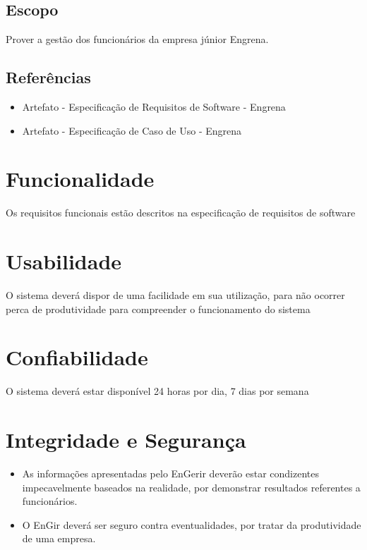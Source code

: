 \begin{apendicesenv}
\subsection{Escopo}

Prover a gestão dos funcionários da empresa júnior Engrena.

\subsection{Referências}

\begin{itemize}
\item{Artefato - Especificação de Requisitos de Software - Engrena}
\item{Artefato - Especificação de Caso de Uso - Engrena}
\end{itemize}

\section{Funcionalidade}

Os requisitos funcionais estão descritos na especificação de requisitos de software

\section{Usabilidade}

O sistema deverá dispor de uma facilidade em sua utilização, para não ocorrer perca de produtividade para compreender o funcionamento do sistema

\section{Confiabilidade}

O sistema deverá estar disponível 24 horas por dia, 7 dias por semana

\section{Integridade e Segurança}

\begin{itemize}
\item{As informações apresentadas pelo EnGerir deverão estar condizentes impecavelmente baseados na realidade, por demonstrar resultados referentes a funcionários.}
\item{O EnGir deverá ser seguro contra eventualidades, por tratar da produtividade de uma empresa.}
\end{itemize}


\end{apendicesenv}

